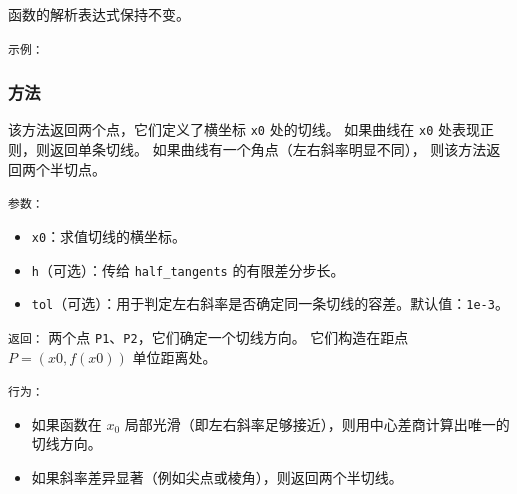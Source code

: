 函数的解析表达式保持不变。

\medskip
\texttt{示例：}

\begin{tkzexample}[vbox]
\begin{center}
\end{center}
\end{tkzexample}




\subsubsection{方法 }
\label{ssub:fct_tangent}

该方法返回两个点，它们定义了横坐标 \texttt{x0} 处的切线。
如果曲线在 \texttt{x0} 处表现正则，则返回单条切线。
如果曲线有一个角点（左右斜率明显不同），
则该方法返回两个半切点。

\medskip

\texttt{参数：}
\begin{itemize}
\item \texttt{x0}：求值切线的横坐标。
\item \texttt{h}（可选）：传给 \texttt{half\_tangents} 的有限差分步长。
\item \texttt{tol}（可选）：用于判定左右斜率是否确定同一条切线的容差。默认值：\texttt{1e-3}。
\end{itemize}

\medskip

\texttt{返回：}
两个点 \texttt{P1}、\texttt{P2}，它们确定一个切线方向。
它们构造在距点 $P=(x0,f(x0))$ 单位距离处。

\medskip

\texttt{行为：}

\begin{itemize}
  \item 如果函数在 $x_0$ 局部光滑（即左右斜率足够接近），则用中心差商计算出唯一的切线方向。
  \item 如果斜率差异显著（例如尖点或棱角），则返回两个半切线。
\end{itemize}


